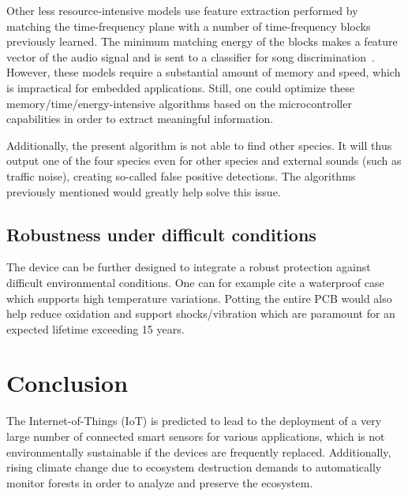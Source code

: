 \documentclass{EPL-master-thesis-covers-EN}
\begin{document}
Other less resource-intensive models use feature extraction performed by matching the time-frequency plane with a number of time-frequency blocks previously learned. The minimum matching energy of the blocks makes a feature vector of the audio signal and is sent to a classifier for song discrimination~\cite{4959924}.
However, these models require a substantial amount of memory and speed, which is impractical for embedded applications. Still, one could optimize these memory/time/energy-intensive algorithms based on the microcontroller capabilities in order to extract meaningful information.

Additionally, the present algorithm is not able to find other species. It will thus output one of the four species even for other species and external sounds (such as traffic noise), creating so-called false positive detections. The algorithms previously mentioned would greatly help solve this issue.

\section{Robustness under difficult conditions}

The device can be further designed to integrate a robust protection against difficult environmental conditions. One can for example cite a waterproof case which supports high temperature variations. Potting the entire PCB would also help reduce oxidation and support shocks/vibration which are paramount for an expected lifetime exceeding 15 years.


\chapter{Conclusion}
\label{chapter:conclusion}

The Internet-of-Things (IoT) is predicted to lead to the deployment of a very large number of connected smart sensors for various applications, which is not environmentally sustainable if the devices are frequently replaced.
Additionally, rising climate change due to ecosystem destruction demands to automatically monitor forests in order to analyze and preserve the ecosystem.
\end{document}
